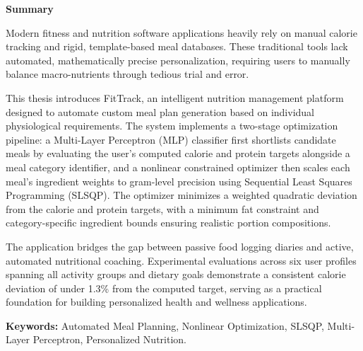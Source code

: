 \newpage
\begin{center}
    \LARGE
    \textbf{\thesistitle}
    
    \vspace{0.5cm}
    
    \authornamefl
    
    \vspace{1cm}
    
    \textbf{Summary}
    
    \vspace{1cm}
\end{center}

Modern fitness and nutrition software applications heavily rely on manual calorie tracking 
and rigid, template-based meal databases. 
These traditional tools lack automated, mathematically precise personalization, requiring
 users to manually balance macro-nutrients through tedious trial and error. 

This thesis introduces FitTrack, an intelligent nutrition management platform designed to
automate custom meal plan generation based on individual physiological requirements.
The system implements a two-stage optimization pipeline: a Multi-Layer Perceptron (MLP)
classifier first shortlists candidate meals by evaluating the user's computed calorie and
protein targets alongside a meal category identifier, and a nonlinear constrained
optimizer then scales each meal's ingredient weights to gram-level precision using
Sequential Least Squares Programming (SLSQP). The optimizer minimizes a weighted
quadratic deviation from the calorie and protein targets, with a minimum fat constraint
and category-specific ingredient bounds ensuring realistic portion compositions.

The application bridges the gap between passive food logging diaries and active, automated
nutritional coaching. Experimental evaluations across six user profiles spanning all
activity groups and dietary goals demonstrate a consistent calorie deviation of under
1.3\% from the computed target, serving as a practical foundation for building
personalized health and wellness applications.

\vspace{0.5cm}
\noindent \textbf{Keywords:} Automated Meal Planning, Nonlinear Optimization, SLSQP, Multi-Layer Perceptron, Personalized Nutrition.
